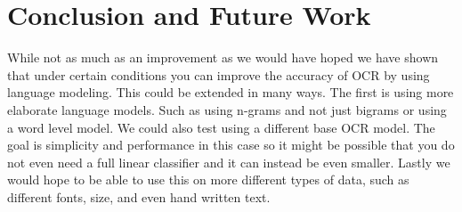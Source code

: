 \documentclass[10pt,twocolumn,letterpaper]{article}
\begin{document}
\section{Conclusion and Future Work}
\label{conclusion_future_work}
While not as much as an improvement as we would have hoped we have shown that under certain conditions you can improve the accuracy of OCR by using language modeling.  This could be extended in many ways.  The first is using more elaborate language models.  Such as using n-grams and not just bigrams or using a word level model.  We could also test using a different base OCR model.  The goal is simplicity and performance in this case so it might be possible that you do not even need a full linear classifier and it can instead be even smaller.  Lastly we would hope to be able to use this on more different types of data, such as different fonts, size, and even hand written text.




{\small


}
\end{document}
